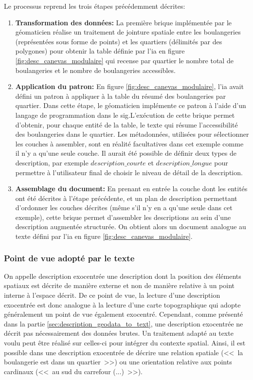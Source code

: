 Le processus reprend les trois étapes précédemment décrites:

\begin{enumerate}
    \item \textbf{Transformation des données:} La première brique implémentée par le géomaticien réalise un traitement de jointure spatiale entre les boulangeries (représentées sous forme de points) et les quartiers (délimités par des polygones) pour obtenir la table définie par l'\gls{ia} en figure \ref{fig:desc_canevas_modulaire} qui recense par quartier le nombre total de boulangeries et le nombre de boulangeries accessibles.
    \item \textbf{Application du patron:} En figure \ref{fig:desc_canevas_modulaire}, l'\gls{ia} avait défini un patron à appliquer à la table du résumé des boulangeries par quartier. Dans cette étape, le géomaticien implémente ce patron à l'aide d'un langage de programmation dans le \gls{sig}.L'exécution de cette brique permet d'obtenir, pour chaque entité de la table, le texte qui résume l'accessibilité des boulangeries dans le quartier. Les métadonnées, utilisées pour sélectionner les couches à assembler, sont en réalité facultatives dans cet exemple comme il n'y a qu'une seule couche. Il aurait été possible de définir deux types de description, par exemple $description\_courte$ et $description\_longue$ pour permettre à l'utilisateur final de choisir le niveau de détail de la description.
    \item \textbf{Assemblage du document:} En prenant en entrée la couche dont les entités ont été décrites à l'étape précédente, et un plan de description permettant d'ordonner les couches décrites (même s'il n'y en a qu'une seule dans cet exemple), cette brique permet d'assembler les descriptions au sein d'une description augmentée structurée. On obtient alors un document analogue au texte défini par l'\gls{ia} en figure \ref{fig:desc_canevas_modulaire}.
\end{enumerate}

\subsubsection{Point de vue adopté par le texte}

On appelle description exocentrée une description dont la position des éléments spatiaux est décrite de manière externe et non de manière relative à un point interne à l'espace décrit. De ce point de vue, la lecture d'une description exocentrée est donc analogue à la lecture d'une carte topographique qui adopte généralement un point de vue également exocentré. Cependant, comme présenté dans la partie \ref{sec:description_geodata_to_text}, une description exocentrée ne décrit pas nécessairement des données brutes. Un traitement adapté au texte voulu peut être réalisé sur celles-ci pour intégrer du contexte spatial. Ainsi, il est possible dans une description exocentrée de décrire une relation spatiale (<<~la boulangerie est dans un quartier~>>) ou une orientation relative aux points cardinaux (<<~au sud du carrefour (...)~>>).

